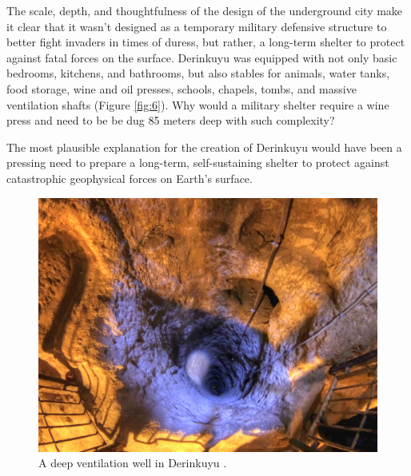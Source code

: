 \documentclass[10pt,twocolumn,letterpaper]{article}
\begin{document}
The scale, depth, and thoughtfulness of the design of the underground city make it clear that it wasn't designed as a temporary military defensive structure to better fight invaders in times of duress, but rather, a long-term shelter to protect against fatal forces on the surface. Derinkuyu was equipped with not only basic bedrooms, kitchens, and bathrooms, but also stables for animals, water tanks, food storage, wine and oil presses, schools, chapels, tombs, and massive ventilation shafts (Figure \ref{fig:6}). Why would a military shelter require a wine press and need to be be dug 85 meters deep with such complexity?

The most plausible explanation for the creation of Derinkuyu would have been a pressing need to prepare a long-term, self-sustaining shelter to protect against catastrophic geophysical forces on Earth's surface.

\begin{figure}[t]
\begin{center}
   \includegraphics[width=1\linewidth]{derinkuyu-air.jpg}
\end{center}
   \caption{A deep ventilation well in Derinkuyu \cite{53}.}
\label{fig:6}
\label{fig:onecol}
\end{figure}


\end{document}
